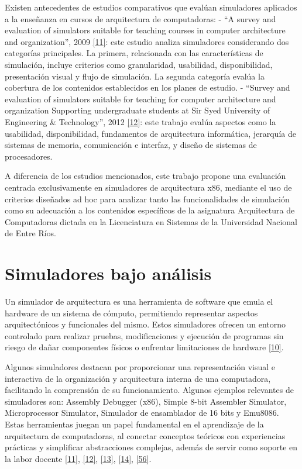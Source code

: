\documentclass[12pt,oneside]{templates/unerthesis}
\begin{document}
Existen antecedentes de estudios comparativos que evalúan simuladores aplicados a la enseñanza en cursos de arquitectura de computadoras:
- ``A survey and evaluation of simulators suitable for teaching courses in computer architecture and organization'', 2009 \protect\hyperlink{ref-nikolic_survey_2009}{{[}11{]}}: este estudio analiza simuladores considerando dos categorías principales. La primera, relacionada con las características de simulación, incluye criterios como granularidad, usabilidad, disponibilidad, presentación visual y flujo de simulación. La segunda categoría evalúa la cobertura de los contenidos establecidos en los planes de estudio.
- ``Survey and evaluation of simulators suitable for teaching for computer architecture and organization Supporting undergraduate students at Sir Syed University of Engineering \& Technology'', 2012 \protect\hyperlink{ref-hasan_survey_2012}{{[}12{]}}: este trabajo evalúa aspectos como la usabilidad, disponibilidad, fundamentos de arquitectura informática, jerarquía de sistemas de memoria, comunicación e interfaz, y diseño de sistemas de procesadores.

A diferencia de los estudios mencionados, este trabajo propone una evaluación centrada exclusivamente en simuladores de arquitectura x86, mediante el uso de criterios diseñados ad hoc para analizar tanto las funcionalidades de simulación como su adecuación a los contenidos específicos de la asignatura Arquitectura de Computadoras dictada en la Licenciatura en Sistemas de la Universidad Nacional de Entre Ríos.

\hypertarget{simuladores-bajo-anuxe1lisis}{%
\section{Simuladores bajo análisis}\label{simuladores-bajo-anuxe1lisis}}

Un simulador de arquitectura es una herramienta de software que emula el hardware de un sistema de cómputo, permitiendo representar aspectos arquitectónicos y funcionales del mismo. Estos simuladores ofrecen un entorno controlado para realizar pruebas, modificaciones y ejecución de programas sin riesgo de dañar componentes físicos o enfrentar limitaciones de hardware \protect\hyperlink{ref-radivojevic_design_2011}{{[}10{]}}.

Algunos simuladores destacan por proporcionar una representación visual e interactiva de la organización y arquitectura interna de una computadora, facilitando la comprensión de su funcionamiento. Algunos ejemplos relevantes de simuladores son: Assembly Debugger (x86), Simple 8-bit Assembler Simulator, Microprocessor Simulator, Simulador de ensamblador de 16 bits y Emu8086. Estas herramientas juegan un papel fundamental en el aprendizaje de la arquitectura de computadoras, al conectar conceptos teóricos con experiencias prácticas y simplificar abstracciones complejas, además de servir como soporte en la labor docente \protect\hyperlink{ref-nikolic_survey_2009}{{[}11{]}}, \protect\hyperlink{ref-hasan_survey_2012}{{[}12{]}}, \protect\hyperlink{ref-hennessy2017computer}{{[}13{]}}, \protect\hyperlink{ref-stallings_computer_2021}{{[}14{]}}, \protect\hyperlink{ref-behrooz_computer_2005}{{[}56{]}}.
\end{document}

